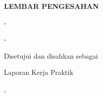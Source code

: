 \begin{titlepage}
\begin{center}
\vspace*{0cm}
{\bfseries\Large LEMBAR PENGESAHAN\par}
\vspace{0.5cm}
{\bfseries\Large \JudulLaporan\par
\bfseries\Large \TempatKP\par}
\vspace{1.5cm}
\Large \NamaMahasiswa- \NIM\par
\Large \NamaMahasiswaDua- \NIMDua\par
\vfill
{Disetujui dan disahkan sebagai\par
Laporan Kerja Praktik\par}
\vspace{1.2cm}
{\KotaPerusahaan, \TanggalPengesahan\par}
\vspace{0.6cm}
{\JabatanPembimbingPerusahaan\par
\NamaInstansi\par}
\vspace{1.5cm}
{\underline{\NamaPembimbingPerusahaan}}
\end{center}
\end{titlepage}
